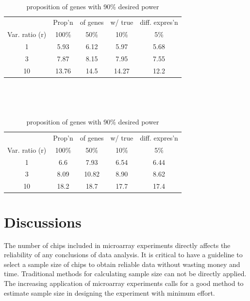 \documentclass{bioinfo}
\begin{document}
\begin{table}\centering
  \caption{proposition of genes with 80\% desired power}\
  \begin{tabular}{ccccc} \hline
    &Prop'n&of genes& w/ true & diff. expres'n\\
    Var. ratio (r) & 100\% & 50\% & 10\% & 5\%\\
    \hline
    1 & 5.93 & 6.12 & 5.97 & 5.68\\
    3 & 7.87 & 8.15 & 7.95 & 7.55\\
    10 & 13.76 & 14.5 & 14.27 & 12.2\\
    \hline
  \end{tabular}
  \label{tb:Guidea}
  \\
  \caption{proposition of genes with 90\% desired power}\
  \begin{tabular}{ccccc} \hline
    &Prop'n&of genes& w/ true & diff. expres'n\\
    Var. ratio (r) & 100\% & 50\% & 10\% & 5\%\\
    \hline
    1 & 6.6 & 7.93 & 6.54 & 6.44\\
    3 & 8.09 & 10.82 & 8.90 & 8.62\\
    10 & 18.2 & 18.7 & 17.7 & 17.4\\
    \hline
  \end{tabular}
  \label{tb:Guideb}
\end{table}




\section{Discussions}

The number of chips included in microarray experiments directly
affects the reliability of any conclusions of data analysis. It is
critical to have a guideline to select a sample size of chips to
obtain reliable data without wasting money and time. Traditional
methods for calculating sample size can not be directly applied.
The increasing application of microarray experiments calls for a
good method to estimate sample size in designing the experiment
with minimum effort.
\end{document}
